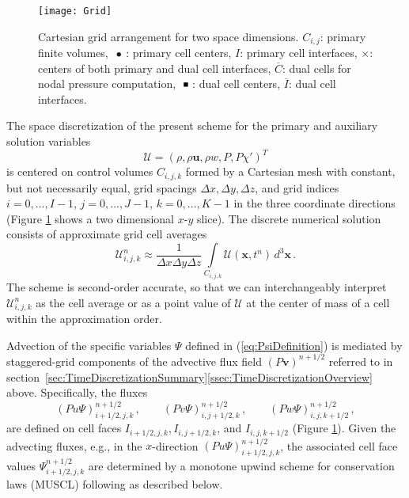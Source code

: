 \documentclass{ametsoc}
\theoremstyle{definition}
\newcommand{\eq}[1]{(\ref{#1})}
\newcommand{\vect}[1]{{\mathbf{#1}}}
\newcommand{\vu}{\vect{u}}
\newcommand{\vv}{\vect{v}}
\newcommand{\vx}{\vect{x}}
\newcommand{\half}{1/2}
\newcommand{\dz}{\Delta z}
\newcommand{\chiprime}{{\chi'}}
\newcommand{\Sol}{\mathcal{U}}
\newcommand{\dx}{{\Delta x}}
\newcommand{\dy}{{\Delta y}}
\begin{document}
\begin{figure}
\centering
 \texttt{[image: Grid]}
\caption{Cartesian grid arrangement for two space dimensions. 
$C_{i,j}$: primary finite volumes, 
$\ \bullet\ $: primary cell centers, $I$: primary cell interfaces,
$\times$: centers of both primary and dual cell interfaces, 
$\overline{C}$: dual cells for nodal pressure computation, $\ \rule[1pt]{4pt}{4pt}\ $:
dual cell centers, $\overline{I}$: dual cell interfaces.
\label{fig:GridArrangement}}
\end{figure}

The space discretization of the present scheme for the primary
and auxiliary solution variables 
%
\begin{equation}
\Sol = \left(\rho, \rho\vu, \rho w, P, P\chiprime \right)^T
\end{equation}
%
is centered on control volumes $C_{i,j,k}$ formed by a Cartesian mesh with constant,
but not necessarily equal, grid spacings $\dx, \dy, \dz$, and grid indices 
$i = 0, ..., I-1$, $j = 0, ..., J-1$, $k = 0, ..., K-1$ in the three coordinate directions (Figure \ref{fig:GridArrangement} shows a two dimensional $x$-$y$ slice). 
The discrete numerical solution consists of approximate grid cell averages 
%
\begin{equation}
\Sol_{i,j,k}^n \approx 
\frac{1}{\dx \dy \dz}\int\limits_{C_{i,j,k}} \Sol(\vx,t^n)\, d^3\vx\,.
\end{equation}
%
The scheme is second-order accurate, so that we can interchangeably interpret 
$\Sol_{i,j,k}^n$ as the cell average or as a point value of $\Sol$ at the center of 
mass of a cell within the approximation order.  

Advection of the specific variables $\Psi$ defined in \eq{eq:PsiDefinition} is mediated 
by staggered-grid components of the advective flux field $(P\vv)^{n+\half}$ referred
to in section~\ref{sec:TimeDiscretizationSummary}\ref{ssec:TimeDiscretizationOverview} 
above. Specifically, the fluxes
%
\begin{equation}\label{eq:DiscreteAdvectiveFluxes}
(Pu \Psi)^{n+\half}_{i+\half,j,k}\,,
\qquad
(Pv \Psi)^{n+\half}_{i,j+\half,k}\,, 
\qquad
(Pw \Psi)^{n+\half}_{i,j,k+\half}\,,
\end{equation}
%
are defined on cell faces $I_{i+\half,j,k}, I_{i,j+\half,k}$, and $I_{i,j,k+\half}$ 
(Figure \ref{fig:GridArrangement}). 
Given the advecting fluxes, e.g., in the $x$-direction 
$(Pu \Psi)^{n+\half}_{i+\half,j,k}$, the associated cell face values 
$\Psi^{n+\half}_{i+\half,j,k}$ 
are determined by a monotone upwind scheme for conservation laws (MUSCL) following 
\citet{vanLeer2006} as described below.
\end{document}
